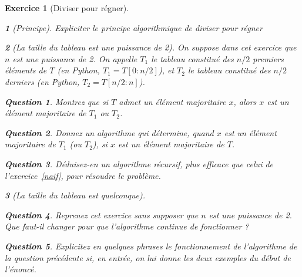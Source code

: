 \documentclass{article}
\theoremstyle{exostyle}
\newtheorem{exo}{Exercice}
\theoremstyle{partiestyle}
\newtheorem{partie}{}[exo]
\theoremstyle{questionstyle}
\newtheorem{questionpartie}{Question}[partie]
\begin{document}
\begin{exo}[Diviser pour régner]

\begin{partie}[Principe]

    Expliciter le principe algorithmique de {\it diviser pour régner}

\end{partie}
\begin{partie}[La taille du tableau est une puissance de 2]
    On suppose dans cet exercice que $n$ est une puissance de 2. On appelle $T_1$ le tableau constitué des $n/2$ premiers éléments de $T$ (en Python, $T_1 = T[0:n/2]$), et $T_2$ le tableau constitué des $n/2$ derniers (en Python, $T_2 = T[n/2 : n]$).
\begin{questionpartie}
Montrez que si $T$ admet un élément majoritaire $x$, alors $x$ est un élément majoritaire de $T_1$ ou $T_2$.
\end{questionpartie}
\begin{questionpartie}
    Donnez un algorithme qui détermine, quand $x$ est un élément majoritaire de $T_1$ (ou $T_2$), si $x$ est un élément majoritaire de $T$.
\end{questionpartie}
\begin{questionpartie}
    Déduisez-en un algorithme récursif, plus efficace que celui de l'exercice~\ref{naif}, pour résoudre le problème.
\end{questionpartie}
\end{partie}
\begin{partie}[La taille du tableau est quelconque]
    \begin{questionpartie}
        Reprenez cet exercice sans supposer que $n$ est une puissance de 2. Que faut-il changer pour que l'algorithme continue de fonctionner ?
    \end{questionpartie} 
    \begin{questionpartie}
        Explicitez en quelques phrases le fonctionnement de l'algorithme de la question précédente si, en entrée, on lui donne les deux exemples du début de l'énoncé.
    \end{questionpartie}     
\end{partie}
\end{exo}
\end{document}
